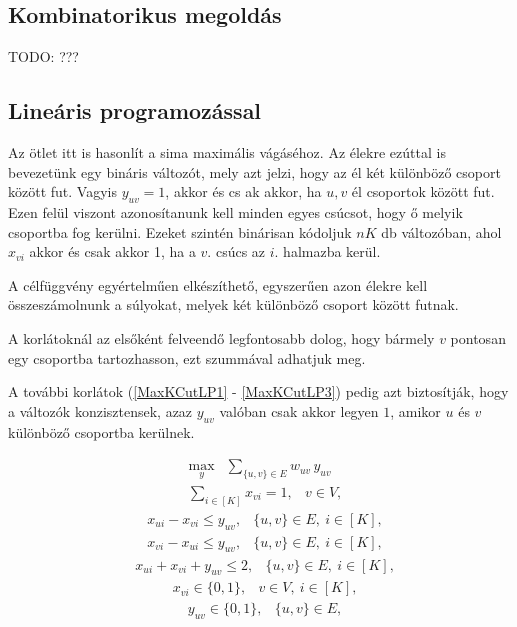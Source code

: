 \subsection{Kombinatorikus megoldás}
TODO: ???

\subsection{Lineáris programozással}

Az ötlet itt is hasonlít a sima maximális vágáséhoz. Az élekre ezúttal is bevezetünk egy bináris változót, mely azt jelzi, hogy az él két különböző csoport között fut. Vagyis $y_{uv}=1$, akkor és cs
ak akkor, ha $u, v$ él csoportok között fut. Ezen felül viszont azonosítanunk kell minden egyes csúcsot, hogy ő melyik csoportba fog kerülni. Ezeket szintén binárisan kódoljuk $nK$ db változóban, ahol $x_{vi}$ akkor és csak akkor 1, ha a $v.$ csúcs az $i.$ halmazba kerül. 

A célfüggvény egyértelműen elkészíthető, egyszerűen azon élekre kell összeszámolnunk a súlyokat, melyek két különböző csoport között futnak.

A korlátoknál az elsőként felveendő legfontosabb dolog, hogy bármely $v$ pontosan egy csoportba tartozhasson, ezt  szummával adhatjuk meg.

A további korlátok (\ref{MaxKCutLP1} - \ref{MaxKCutLP3}) pedig azt biztosítják, hogy a változók konzisztensek, azaz $y_{uv}$ valóban csak akkor legyen $1$, amikor $u$ és $v$ különböző csoportba kerülnek.

\begin{align} \max _{y} &\sum _{\{{u,v}\} \in E} w_{uv} \, y_{uv}  \end{align}
\begin{align} &\sum _{i \in [K]} x_{vi} = 1,&v \in V, \label{sumMaxKCutLPEachNodeInOnePartition} \end{align}
\begin{align}&x_{ui} - x_{vi} \le y_{uv},&\{{u,v}\} \in E, \ i\in [K], \label{MaxKCutLP1} \end{align}
\begin{align}&x_{vi} - x_{ui} \le y_{uv},&\{{u,v}\} \in E, \ i\in [K], \end{align}
\begin{align}&x_{ui} + x_{vi} + y_{uv} \le 2,&\{{u,v}\} \in E, \ i\in [K], \label{MaxKCutLP3} \end{align}
\begin{align}&x_{vi} \in \{{0,1}\} ,&v \in V, \ i\in [K],\end{align}
\begin{align}&y_{uv} \in \{{0,1}\} ,&\{{u,v}\} \in E, \label{MaxKCutLP5} \end{align}

